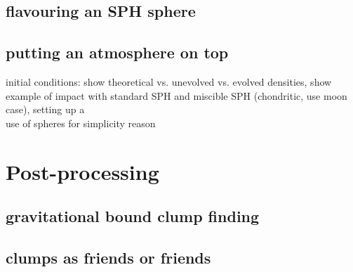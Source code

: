 \subsection{flavouring an SPH sphere}
\subsection{putting an atmosphere on top}
initial conditions: show theoretical vs. unevolved vs. evolved densities, show example of impact with standard SPH and miscible SPH (chondritic, use moon case), setting up a \SSC \\
use of spheres for simplicity reason

\section{Post-processing}
\subsection{gravitational bound clump finding}
\subsection{clumps as friends or friends}

